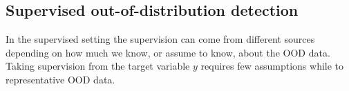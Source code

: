 \subsection{Supervised out-of-distribution detection} \label{subsec: supervised-out-of-distribution-detection}
%
%
In the supervised setting the supervision can come from different sources depending on how much we know, or assume to know, about the OOD data. Taking supervision from the target variable $y$ requires few assumptions while to representative OOD data. 

